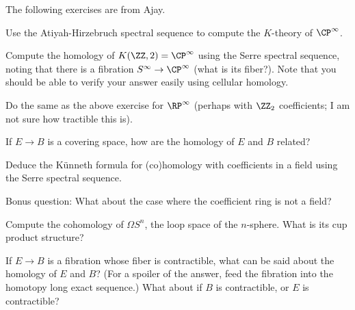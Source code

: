 \documentclass[10pt]{article}
\begin{document}
The following exercises are from Ajay.

\begin{exercise}
    \label{exer:K-th-CPinfty}
    Use the Atiyah-Hirzebruch spectral sequence
    to compute the $K$-theory of $\CP^\infty$.
\end{exercise}

\begin{exercise}
    \label{exer:CPinfty-homology}
    Compute the homology of $K(\ZZ,2) = \CP^\infty$
    using the Serre spectral sequence,
    noting that there is a fibration $S^\infty\to\CP^\infty$
    (what is its fiber?).
    Note that you should be able to verify your answer easily
    using cellular homology.
\end{exercise}

\begin{exercise}
    \label{exer:RPinfty-homology}
    Do the same as the above exercise for $\RP^\infty$
    (perhaps with $\ZZ_2$ coefficients;
    I am not sure how tractible this is).
\end{exercise}

\begin{exercise}
    \label{exer:covering-space-homology}
    If $E\to B$ is a covering space,
    how are the homology of $E$ and $B$ related?
\end{exercise}

\begin{exercise}
    \label{exer:kunneth}
    Deduce the K\"unneth formula
    for (co)homology with coefficients in a field
    using the Serre spectral sequence.

    Bonus question: What about the case where the
    coefficient ring is not a field?
\end{exercise}

\begin{exercise}
    \label{exer:loop-sphere}
    Compute the cohomology of $\Omega S^n$,
    the loop space of the $n$-sphere.
    What is its cup product structure?
\end{exercise}

\begin{exercise}
    \label{exer:contractible-fiber}
    If $E\to B$ is a fibration whose fiber is contractible,
    what can be said about the homology of $E$ and $B$?
    (For a spoiler of the answer, feed the fibration
    into the homotopy long exact sequence.)
    What about if $B$ is contractible, or $E$ is contractible?
\end{exercise}
\end{document}
